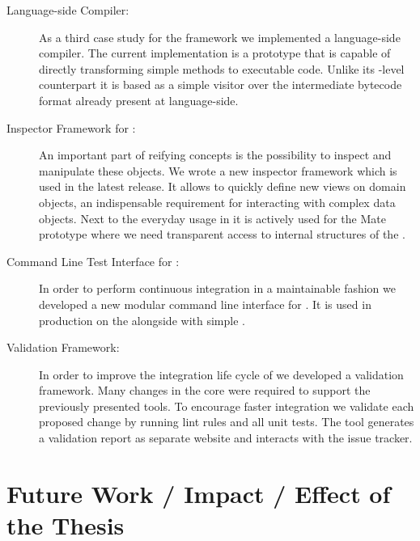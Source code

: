 \begin{description}
	\item[\NBJ Language-side \JIT Compiler:]
		As a third case study for the \B framework we implemented a language-side \JIT compiler. 
		The current implementation is a prototype that is capable of directly transforming simple methods to executable code.
		Unlike its \VM-level counterpart it is based as a simple visitor over the intermediate bytecode format already present at language-side.

	\item[Inspector Framework for \PH:] 
		An important part of reifying concepts is the possibility to inspect and manipulate these objects.
		We wrote a new inspector framework which is used in the latest \PH release.
		It allows to quickly define new views on domain objects, an indispensable requirement for interacting with complex data objects.
		Next to the everyday usage in \PH it is actively used for the Mate \VM prototype where we need transparent access to internal structures of the \VM.

	\item[Command Line Test Interface for \PH:]
		In order to perform continuous integration in a maintainable fashion we developed a new modular command line interface for \PH. 
		It is used in production on the  alongside with simple .
		
	\item[Validation Framework:]
		In order to improve the integration life cycle of \PH we developed a validation framework.
		Many changes in the core \PH were required to support the previously presented tools.
		To encourage faster integration we validate each proposed change by running lint rules and all unit tests.
		The tool generates a validation report as separate website and interacts with the issue tracker.
	
\end{description}


\section{Future Work / Impact / Effect of the Thesis}
\\
\\
\\
\\


